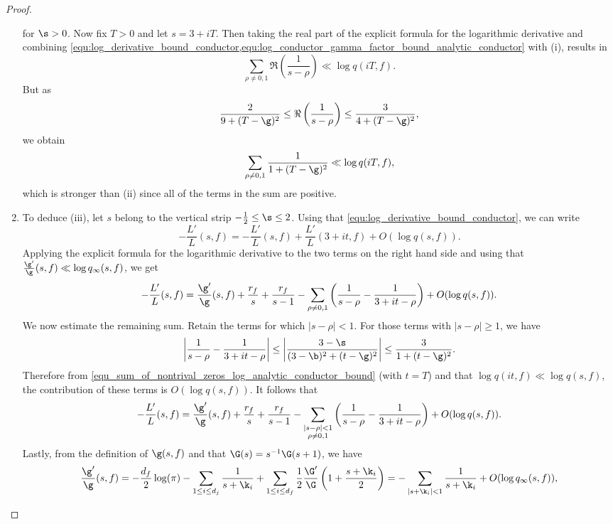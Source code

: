 \begin{proof}
\begin{enumerate}[label=(\roman*)]
        for $\s > 0$. Now fix $T > 0$ and let $s = 3+iT$. Then taking the real part of the explicit formula for the logarithmic derivative and combining \cref{equ:log_derivative_bound_conductor,equ:log_conductor_gamma_factor_bound_analytic_conductor} with (i), results in
        \[
          \sum_{\rho \neq 0,1}\Re\left(\frac{1}{s-\rho}\right) \ll \log{q(iT,f)}.
        \]
        But as
        \[
          \frac{2}{9+(T-\g)^{2}} \le \Re\left(\frac{1}{s-\rho}\right) \le \frac{3}{4+(T-\g)^{2}},
        \]
        we obtain
        \begin{equation}\label{equ_sum_of_nontrival_zeros_log_analytic_conductor_bound}
          \sum_{\rho \neq 0,1}\frac{1}{1+(T-\g)^{2}} \ll \log{q(iT,f)},
        \end{equation}
        which is stronger than (ii) since all of the terms in the sum are positive.
        \item To deduce (iii), let $s$ belong to the vertical strip $-\frac{1}{2} \le \s \le 2$. Using that \cref{equ:log_derivative_bound_conductor}, we can write
        \[
          -\frac{L'}{L}(s,f) = -\frac{L'}{L}(s,f)+\frac{L'}{L}(3+it,f)+O(\log{q(s,f)}).
        \]
        Applying the explicit formula for the logarithmic derivative to the two terms on the right hand side and using that $\frac{\g'}{\g}(s,f) \ll \log{q_{\infty}(s,f)}$, we get
        \[
          -\frac{L'}{L}(s,f) = \frac{\g'}{\g}(s,f)+\frac{r_{f}}{s}+\frac{r_{f}}{s-1}-\sum_{\rho \neq 0,1}\left(\frac{1}{s-\rho}-\frac{1}{3+it-\rho}\right)+O(\log{q(s,f)}).
        \]
        We now estimate the remaining sum. Retain the terms for which $|s-\rho| < 1$. For those terms with $|s-\rho| \ge 1$, we have
        \[
          \left|\frac{1}{s-\rho}-\frac{1}{3+it-\rho}\right| \le \left|\frac{3-\s}{(3-\b)^{2}+(t-\g)^{2}}\right| \le \frac{3}{1+(t-\g)^{2}}.
        \]
        Therefore from \cref{equ_sum_of_nontrival_zeros_log_analytic_conductor_bound} (with $t = T$) and that $\log{q(it,f)} \ll \log{q(s,f)}$, the contribution of these terms is $O(\log{q(s,f)})$. It follows that
        \[
          -\frac{L'}{L}(s,f) = \frac{\g'}{\g}(s,f)+\frac{r_{f}}{s}+\frac{r_{f}}{s-1}-\sum_{\substack{|s-\rho| < 1 \\ \rho \neq 0,1}}\left(\frac{1}{s-\rho}-\frac{1}{3+it-\rho}\right)+O(\log{q(s,f)}).
        \]
        Lastly, from the definition of $\g(s,f)$ and that $\G(s) = s^{-1}\G(s+1)$, we have
        \[
          \frac{\g'}{\g}(s,f) = -\frac{d_{f}}{2}\log(\pi)-\sum_{1 \le i \le d_{j}}\frac{1}{s+\k_{i}}+\sum_{1 \le i \le d_{f}}\frac{1}{2}\frac{\G'}{\G}\left(1+\frac{s+\k_{i}}{2}\right) = -\sum_{|s+\k_{i}| < 1}\frac{1}{s+\k_{i}}+O(\log{q_{\infty}(s,f)}),
\]
\end{enumerate}
\end{proof}
